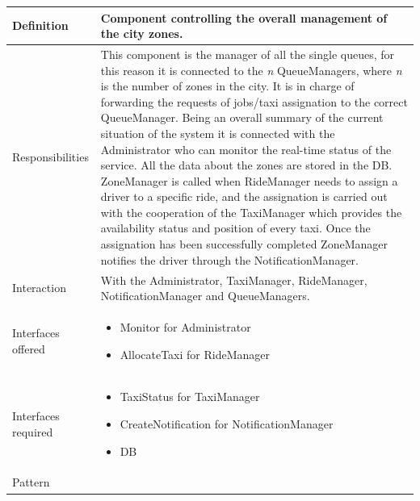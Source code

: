 \documentclass[a4paper,11pt]{report} %
\begin{document}
	\begin{center}
		\begin{tabular}{| l | p{9cm} |}\hline
			Definition & Component controlling the overall management of the city zones.\\\hline
			Responsibilities & This component is the manager of all the single queues, for this reason it is connected to the \textit{n} QueueManagers, where \textit{n} is the number of zones in the city. It is in charge of forwarding the requests of jobs/taxi assignation to the correct QueueManager. Being an overall summary of the current situation of the system it is connected with the Administrator who can monitor the real-time status of the service. All the data about the zones are stored in the DB. ZoneManager is called when RideManager needs to assign a driver to a specific ride, and the assignation is carried out with the cooperation of the TaxiManager which provides the availability status and position of every taxi. Once the assignation has been successfully completed ZoneManager notifies the driver through the NotificationManager.\\\hline
			Interaction & With the Administrator, TaxiManager, RideManager, NotificationManager and QueueManagers.\\\hline
			Interfaces offered & \begin{itemize}
				\item Monitor for Administrator
				\item AllocateTaxi for RideManager
			\end{itemize}\\\hline
			Interfaces required & \begin{itemize}
				\item TaxiStatus for TaxiManager
				\item CreateNotification for NotificationManager
				\item DB
			\end{itemize}\\\hline
			Pattern & \\\hline
		\end{tabular}
	\end{center}
	
\end{document}
